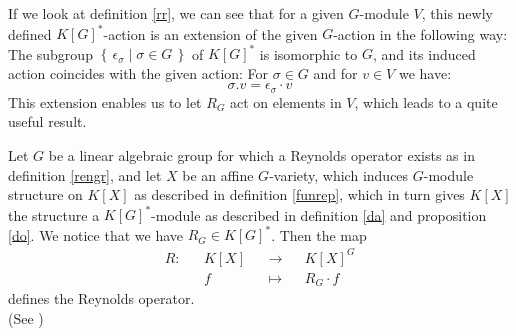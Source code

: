   If we look at definition \ref{rr}, we can see that for a given $G$-module $V$, this newly defined $K[G]^\ast$-action is an extension of the given $G$-action in the following way:
  The subgroup $\left\{\, \epsilon_\sigma \mid \sigma \in G \,\right\}$ of $K[G]^\ast$ is isomorphic to $G$, and its induced action coincides with the given action:
  For $\sigma \in G$ and for $v \in V$ we have:
  \begin{equation*}
    \sigma . v = \epsilon_\sigma \cdot v
  \end{equation*}
This extension enables us to let $R_G$ act on elements in $V$, which leads to a quite useful result.

\begin{theorem}\label{ro}
  Let $G$ be a linear algebraic group for which a Reynolds operator exists as in definition \ref{rengr}, and let $X$ be an affine $G$-variety, which induces $G$-module structure on $K[X]$ as described in definition \ref{funrep}, which in turn gives $K[X]$ the structure a $K[G]^\ast$-module as described in definition \ref{da} and proposition \ref{do}.
  We notice that we have $R_G \in K[G]^\ast$.
  Then the map
  \begin{equation*}
    \begin{aligned}
      R \colon &&K[X] &&\longrightarrow&& K[X]^G  \\
      && f&& \longmapsto&& R_G \cdot f
    \end{aligned}
  \end{equation*}
  defines the Reynolds operator.  \\
  (See \cite[4.5.10]{DK15})
\end{theorem}

